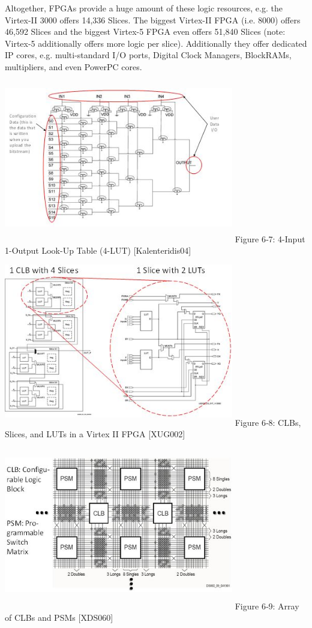 \documentclass[
]{article}
\begin{document}
Altogether, FPGAs provide a huge amount of these logic resources, e.g.
the Virtex-II 3000 offers 14,336 Slices. The biggest Virtex-II FPGA
(i.e. 8000) offers 46,592 Slices and the biggest Virtex-5 FPGA even
offers 51,840 Slices (note: Virtex-5 additionally offers more logic per
slice). Additionally they offer dedicated IP cores, e.g. multi-standard
I/O ports, Digital Clock Managers, BlockRAMs, multipliers, and even
PowerPC cores.
\includegraphics[width=3.94849in,height=2.93699in]{6-7.png}
Figure 6‑7: 4-Input 1-Output Look-Up Table (4-LUT) {[}Kalenteridis04{]}
\includegraphics[width=3.94849in,height=2.93699in]{6-8.png}
Figure 6‑8: CLBs, Slices, and LUTs in a Virtex II FPGA {[}XUG002{]}
\includegraphics[width=3.94849in,height=2.93699in]{6-9.png}
Figure 6‑9:\protect\hypertarget{Fig69}{}{} Array of CLBs and PSMs
{[}XDS060{]}
\end{document}
